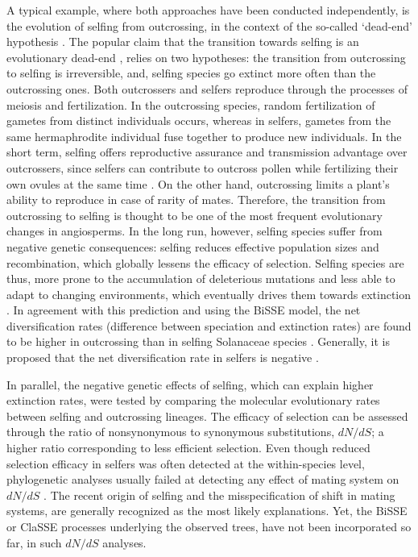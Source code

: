 \documentclass[a4paper,11pt]{article}
\theoremstyle{plain}
\theoremstyle{definition}
\numberwithin{equation}{section}
\begin{document}
A typical example, where both approaches have been conducted
independently, is the evolution of selfing from 
outcrossing, in the context of the so-called `dead-end' 
hypothesis \cite{stebbins}. The popular claim that the
transition towards selfing is an evolutionary dead-end
\cite{busch_igic}, relies on two hypotheses: the transition
from outcrossing to selfing is irreversible, 
and, selfing species go extinct more often than the
outcrossing ones. Both outcrossers and selfers reproduce through
the processes of meiosis and fertilization.  In the outcrossing
species, random fertilization of gametes from distinct individuals
occurs, whereas in selfers, gametes from the same hermaphrodite
individual fuse together to produce new individuals. 
In the short term, selfing offers reproductive assurance and transmission advantage 
over outcrossers, since selfers can contribute
to outcross pollen while fertilizing their own ovules at the same
time \cite{charlesworth}. On the other hand, outcrossing limits a plant's
ability to reproduce in case of rarity of mates. Therefore, the transition from
outcrossing to selfing is thought to be one of the most frequent
evolutionary changes in angiosperms. In the long run, however, selfing
species suffer from negative genetic consequences: selfing reduces
effective population sizes and recombination, which globally lessens
the efficacy of selection. Selfing species are thus, more prone to
the accumulation of deleterious mutations and less able to adapt to
changing environments, which eventually drives them towards
extinction \cite{wright_etal}. In agreement with this prediction and using the
BiSSE model, the net diversification rates (difference between
speciation and extinction rates) are found to be higher in outcrossing
than in selfing Solanaceae species \cite{goldberg_etal}. 
Generally, it is proposed that the net diversification rate in selfers is negative
\cite{busch_igic}.


In parallel, the negative genetic effects of selfing, which can 
explain higher extinction rates, were tested by comparing the molecular 
evolutionary rates between selfing and outcrossing lineages. The 
efficacy of selection can be assessed through the ratio of 
nonsynonymous to synonymous substitutions, $dN/dS$; a higher ratio 
corresponding to less efficient selection. Even though reduced selection efficacy in 
selfers was often detected at the within-species level, phylogenetic 
analyses usually failed at detecting any effect of mating system on 
$dN/dS$ \cite{glemin_muyle}. The recent origin 
of selfing and the misspecification of shift in mating systems, are 
generally recognized as the most likely explanations. Yet, the BiSSE or 
ClaSSE processes underlying the observed trees, have not been 
incorporated so far, in such $dN/dS$ analyses.
\end{document}
